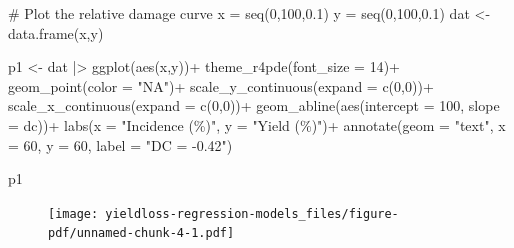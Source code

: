 \documentclass[
  letterpaper,
]{book}
\newenvironment{Shaded}{\begin{snugshade}}{\end{snugshade}}
\newcommand{\AttributeTok}[1]{\textcolor[rgb]{0.40,0.45,0.13}{#1}}
\newcommand{\CommentTok}[1]{\textcolor[rgb]{0.37,0.37,0.37}{#1}}
\newcommand{\DecValTok}[1]{\textcolor[rgb]{0.68,0.00,0.00}{#1}}
\newcommand{\FloatTok}[1]{\textcolor[rgb]{0.68,0.00,0.00}{#1}}
\newcommand{\FunctionTok}[1]{\textcolor[rgb]{0.28,0.35,0.67}{#1}}
\newcommand{\NormalTok}[1]{\textcolor[rgb]{0.00,0.23,0.31}{#1}}
\newcommand{\OtherTok}[1]{\textcolor[rgb]{0.00,0.23,0.31}{#1}}
\newcommand{\SpecialCharTok}[1]{\textcolor[rgb]{0.37,0.37,0.37}{#1}}
\newcommand{\StringTok}[1]{\textcolor[rgb]{0.13,0.47,0.30}{#1}}
\begin{document}
\begin{Shaded}
\begin{Highlighting}[]
\CommentTok{\# Plot the relative damage curve}
\NormalTok{x }\OtherTok{=} \FunctionTok{seq}\NormalTok{(}\DecValTok{0}\NormalTok{,}\DecValTok{100}\NormalTok{,}\FloatTok{0.1}\NormalTok{)}
\NormalTok{y }\OtherTok{=} \FunctionTok{seq}\NormalTok{(}\DecValTok{0}\NormalTok{,}\DecValTok{100}\NormalTok{,}\FloatTok{0.1}\NormalTok{)}
\NormalTok{dat }\OtherTok{\textless{}{-}} \FunctionTok{data.frame}\NormalTok{(x,y)}

\NormalTok{p1 }\OtherTok{\textless{}{-}}\NormalTok{ dat }\SpecialCharTok{|\textgreater{}} 
  \FunctionTok{ggplot}\NormalTok{(}\FunctionTok{aes}\NormalTok{(x,y))}\SpecialCharTok{+}
  \FunctionTok{theme\_r4pde}\NormalTok{(}\AttributeTok{font\_size =} \DecValTok{14}\NormalTok{)}\SpecialCharTok{+}
  \FunctionTok{geom\_point}\NormalTok{(}\AttributeTok{color =} \StringTok{"NA"}\NormalTok{)}\SpecialCharTok{+}  
  \FunctionTok{scale\_y\_continuous}\NormalTok{(}\AttributeTok{expand =} \FunctionTok{c}\NormalTok{(}\DecValTok{0}\NormalTok{,}\DecValTok{0}\NormalTok{))}\SpecialCharTok{+}
  \FunctionTok{scale\_x\_continuous}\NormalTok{(}\AttributeTok{expand =} \FunctionTok{c}\NormalTok{(}\DecValTok{0}\NormalTok{,}\DecValTok{0}\NormalTok{))}\SpecialCharTok{+}
  \FunctionTok{geom\_abline}\NormalTok{(}\FunctionTok{aes}\NormalTok{(}\AttributeTok{intercept =} \DecValTok{100}\NormalTok{, }\AttributeTok{slope =}\NormalTok{ dc))}\SpecialCharTok{+}
  \FunctionTok{labs}\NormalTok{(}\AttributeTok{x =} \StringTok{"Incidence (\%)"}\NormalTok{, }\AttributeTok{y =} \StringTok{"Yield (\%)"}\NormalTok{)}\SpecialCharTok{+}
  \FunctionTok{annotate}\NormalTok{(}\AttributeTok{geom =} \StringTok{"text"}\NormalTok{, }\AttributeTok{x =} \DecValTok{60}\NormalTok{, }\AttributeTok{y =} \DecValTok{60}\NormalTok{, }\AttributeTok{label =} \StringTok{"DC = {-}0.42"}\NormalTok{)}

\NormalTok{p1 }
\end{Highlighting}
\end{Shaded}

\begin{figure}[H]

{\centering \texttt{[image: yieldloss-regression-models\_files/figure-pdf/unnamed-chunk-4-1.pdf]}

}

\end{figure}

\begin{Shaded}
\end{Shaded}
\end{document}
